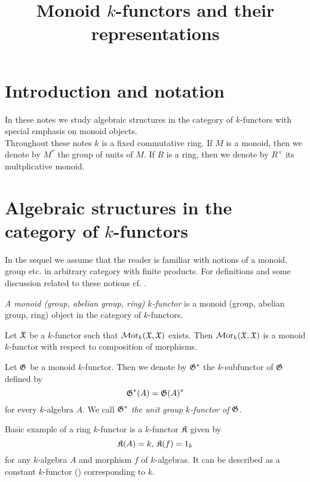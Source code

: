 



\title{Monoid $k$-functors and their representations}
\date{}
\maketitle

\section{Introduction and notation}
\noindent
In these notes we study algebraic structures in the category of $k$-functors with special emphasis on monoid objects.\\
Throughout these notes $k$ is a fixed commutative ring. If $M$ is a monoid, then we denote by $M^*$ the group of units of $M$. If $R$ is a ring, then we denote by $R^{\times}$ its multplicative monoid.

\section{Algebraic structures in the category of $k$-functors}
\noindent
In the sequel we assume that the reader is familiar with notions of a monoid, group etc. in arbitrary category with finite products. For definitions and some discussion related to these notions cf. {\cite[pages 2-5]{Maclane}}.

\begin{definition}
\textit{A monoid (group, abelian group, ring) $k$-functor} is a monoid (group, abelian group, ring) object in the category of $k$-functors.
\end{definition}

\begin{example}\label{example:endomorphisms_of_k_functor}
Let ${\mathfrak X}$ be a $k$-functor such that $\mathcal{M}\mathrm{or}_k({\mathfrak X},{\mathfrak X})$ exists. Then $\mathcal{M}\mathrm{or}_k({\mathfrak X},{\mathfrak X})$ is a monoid $k$-functor with respect to composition of morphisms.
\end{example}

\begin{example}\label{example:units_k_functor_for_a_monoid}
Let ${\mathfrak G}$ be a monoid $k$-functor. Then we denote by ${\mathfrak G}^*$ the $k$-subfunctor of ${\mathfrak G}$ defined by
$${\mathfrak G}^{*}(A) = {\mathfrak G}(A)^{*}$$
for every $k$-algebra $A$. We call ${\mathfrak G}^{*}$ \textit{the unit group $k$-functor of ${\mathfrak G}$}.
\end{example}

\begin{example}\label{example:constant_ring_k_functor}
Basic example of a ring $k$-functor is a $k$-functor $\mathfrak{K}$ given by
$${\mathfrak K}(A) = k,\,{\mathfrak K}(f) = 1_k$$
for any $k$-algebra $A$ and morphism $f$ of $k$-algebras. It can be described as a constant $k$-functor ({\cite[page 67]{Maclane}}) corresponding to $k$.
\end{example}

